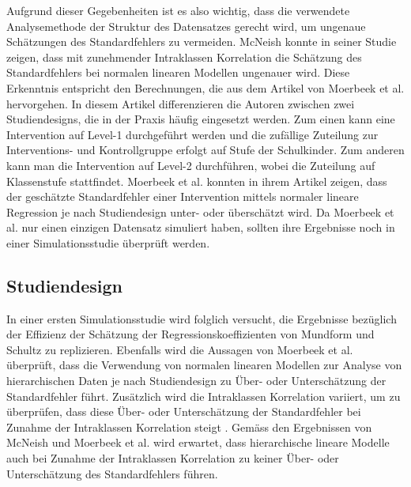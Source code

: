 \documentclass[12pt]{article}\usepackage[]{graphicx}\usepackage[]{color}
\begin{document}
Aufgrund dieser Gegebenheiten ist es also wichtig, dass die verwendete Analysemethode der Struktur des Datensatzes gerecht wird, um ungenaue Schätzungen des Standardfehlers zu vermeiden. McNeish \citeyearpar{mcneish2014analyzing} konnte in seiner Studie zeigen, dass mit zunehmender Intraklassen Korrelation die Schätzung des Standardfehlers bei normalen linearen Modellen ungenauer wird. Diese Erkenntnis entspricht den Berechnungen, die aus dem Artikel von Moerbeek et al. \citeyearpar{MOERBEEK2003341} hervorgehen. In diesem Artikel differenzieren die Autoren zwischen zwei Studiendesigns, die in der Praxis häufig eingesetzt werden. Zum einen kann eine Intervention auf Level-1 durchgeführt werden und die zufällige Zuteilung zur Interventions- und Kontrollgruppe erfolgt auf Stufe der Schulkinder. Zum anderen kann man die Intervention auf Level-2 durchführen, wobei die Zuteilung auf Klassenstufe stattfindet. Moerbeek et al. \citeyearpar{MOERBEEK2003341} konnten in ihrem Artikel zeigen, dass der geschätzte Standardfehler einer Intervention mittels normaler lineare Regression je nach Studiendesign unter- oder überschätzt wird. Da Moerbeek et al. \citeyearpar{MOERBEEK2003341} nur einen einzigen Datensatz simuliert haben, sollten ihre Ergebnisse noch in einer Simulationsstudie überprüft werden. 

\subsection{Studiendesign}
In einer ersten Simulationsstudie wird folglich versucht, die Ergebnisse bezüglich der Effizienz der Schätzung der Regressionskoeffizienten von Mundform und Schultz \citeyearpar{mundfrom2002monte} zu replizieren. Ebenfalls wird die Aussagen von Moerbeek et al. \citeyearpar{MOERBEEK2003341} überprüft, dass die Verwendung von normalen linearen Modellen zur Analyse von hierarchischen Daten je nach Studiendesign zu Über- oder Unterschätzung der Standardfehler führt. Zusätzlich wird die Intraklassen Korrelation variiert, um zu überprüfen, dass diese Über- oder Unterschätzung der Standardfehler bei Zunahme der Intraklassen Korrelation steigt \citep{mcneish2014analyzing}. Gemäss den Ergebnissen von McNeish \citeyearpar{mcneish2014analyzing} und Moerbeek et al. \citeyearpar{MOERBEEK2003341} wird erwartet, dass hierarchische lineare Modelle auch bei Zunahme der Intraklassen Korrelation zu keiner Über- oder Unterschätzung des Standardfehlers führen. 
\end{document}
